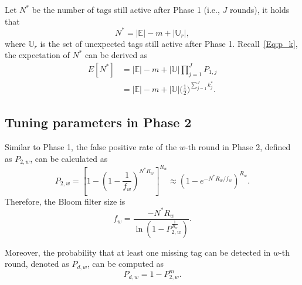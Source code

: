 \documentclass[10pt, twocolumn]{IEEEtran}
\begin{document}
Let $N^*$ be the number of tags still active after Phase 1 (i.e., $J$ rounds), it holds that
\begin{equation}
N^* = |\mathbb{E}|-m+ |\mathbb{U}_r|,
\end{equation}
where $\mathbb{U}_r$ is the set of unexpected tags still active after Phase 1.
Recall~\eqref{Eq:p_k}, the expectation of $N^*$ can be derived as
\begin{align}
E[N^*] &= |\mathbb{E}|-m+|\mathbb{U}| \prod_{j=1}^{J} {P_{1,j}} \nonumber\\
       &= |\mathbb{E}|-m+|\mathbb{U}| \big(\frac{1}{2} \big)^{\sum_{j=1}^{J} k_j^*}.
\label{Eq:E_N^*}
\end{align}

\subsection{Tuning parameters in Phase 2}

Similar to Phase 1, the false positive rate of the $w$-th round in Phase 2, defined as $P_{2,w}$, can be calculated as
\begin{equation}
P_{2,w} = \left[1-\left(1-\frac{1}{f_w}\right)^{N^* R_w}\right]^{R_w} \approx (1-e^{-{N^* {R_w}}/f_w})^{R_w}.
\label{Eq:P_2}
\end{equation}
Therefore, the Bloom filter size is
\begin{equation*}
f_w = \frac{-N^* R_w}{\ln (1- P^{\frac{1}{R_w}}_{2,w})}.
\end{equation*}

Moreover, the probability that at least one missing tag can be detected in $w$-th round, denoted as $P_{d,w}$, can be computed as
\begin{equation}
P_{d,w} = 1-{P^m_{2,w}}.
\label{Eq:P_d}
\end{equation}

\begin{comment}
Similarly, $P_{2,w}$ reaches the minimum value when $R_w=\frac{f_w}{N^*} \ln2$ given $f_w$, i.e.,
\begin{equation}
{P_{2,w}}_{min} = \phi^{f_w /N^*}
\end{equation}

\begin{equation}
f_w = \frac{ N^* {\ln P_{2,w}}_{min}}{ \ln \phi}
\label{Eq:f_2}
\end{equation}

In addition,  the probability that at least one of the missing tags can be detected in $w$-th round, denoted as $P_{d,w}$, can be computed as
\begin{equation}
P_{d,w} = 1-{P^m_{2,w}}_{min} = 1-\phi^{m f_w /N^*}
\label{Eq:P_d}
\end{equation}
\end{comment}
\end{document}

